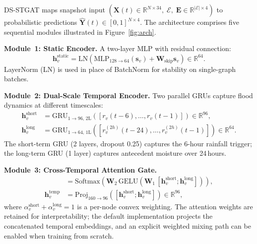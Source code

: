 \documentclass[10pt,twocolumn]{article}
\newcommand{\mat}[1]{\mathbf{#1}}
\newcommand{\calE}{\mathcal{E}}
\newcommand{\RR}{\mathbb{R}}
\begin{document}
DS-STGAT maps snapshot input
$(\mat{X}(t)\in\RR^{N\times 34},\;\calE,\;\mat{E}\in\RR^{|\calE|\times 4})$
to probabilistic predictions $\hat{\mat{Y}}(t)\in[0,1]^{N\times 4}$.
The architecture comprises five sequential modules illustrated in
Figure~\ref{fig:arch}.

\smallskip\noindent\textbf{Module~1: Static Encoder.}
A two-layer MLP with residual connection:
\begin{equation}
  \bm{h}_v^{\text{static}} =
    \mathrm{LN}\!\left(
      \mathrm{MLP}_{128\to 64}(\bm{s}_v)
      + \mat{W}_{\text{skip}}\bm{s}_v
    \right) \in \RR^{64}.
\end{equation}
LayerNorm (LN) is used in place of BatchNorm for stability on
single-graph batches.

\smallskip\noindent\textbf{Module~2: Dual-Scale Temporal Encoder.}
Two parallel GRUs capture flood dynamics at different timescales:
\begin{align}
  \bm{h}_v^{\text{short}} &= \mathrm{GRU}_{1\to 96,\,2\text{L}}\!\left(
    [r_v(t{-}6),\ldots,r_v(t{-}1)]\right) \in \RR^{96}, \\
  \bm{h}_v^{\text{long}} &= \mathrm{GRU}_{1\to 64,\,1\text{L}}\!\left(
    [r_v^{(2h)}(t{-}24),\ldots,r_v^{(2h)}(t{-}1)]\right) \in \RR^{64}.
\end{align}
The short-term GRU (2 layers, dropout 0.25) captures the 6-hour rainfall
trigger; the long-term GRU (1 layer) captures antecedent moisture over
24\,hours.

\smallskip\noindent\textbf{Module~3: Cross-Temporal Attention Gate.}
\begin{align}
  [\alpha_v^{\text{short}},\, \alpha_v^{\text{long}}] &=
    \mathrm{Softmax}\!\left(
      \mat{W}_2\,\mathrm{GELU}(\mat{W}_1\,[\bm{h}_v^{\text{short}};
      \bm{h}_v^{\text{long}}])
    \right), \\
  \bm{h}_v^{\text{temp}} &=
    \mathrm{Proj}_{160\to 96}\!\left(
      [\bm{h}_v^{\text{short}};\bm{h}_v^{\text{long}}]
    \right)\in\RR^{96},
\end{align}
where $\alpha_v^{\text{short}}+\alpha_v^{\text{long}}{=}1$ is a per-node
convex weighting.
The attention weights are retained for interpretability; the default
implementation projects the concatenated temporal embeddings, and an explicit
weighted mixing path can be enabled when training from scratch.
\end{document}
